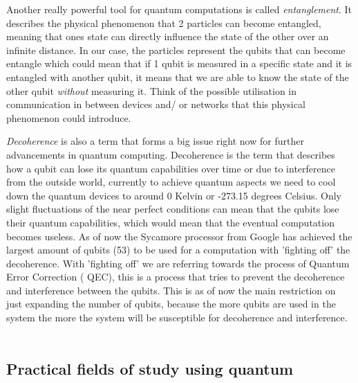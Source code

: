 Another really powerful tool for quantum computations is called \emph{entanglement}. It describes the physical phenomenon that 2 particles can become entangled, meaning that ones state can directly influence the state of the other over an infinite distance. In our case, the particles represent the qubits that can become entangle which could mean that if 1 qubit is measured in a specific state and it is entangled with another qubit, it means that we are able to know the state of the other qubit \emph{without} measuring it. Think of the possible utilisation in communication in between devices and/ or networks that this physical phenomenon could introduce.

\emph{Decoherence} is also a term that forms a big issue right now for further advancements in quantum computing. Decoherence is the term that describes how a qubit can lose its quantum capabilities over time or due to interference from the outside world, currently to achieve quantum aspects we need to cool down the quantum devices to around 0 Kelvin or -273.15 degrees Celsius. Only slight fluctuations of the near perfect conditions can mean that the qubits lose their quantum capabilities, which would mean that the eventual computation becomes useless. As of now the Sycamore processor from Google has achieved the largest amount of qubits (53) to be used for a computation with 'fighting off' the decoherence. With 'fighting off' we are referring towards the process of Quantum Error Correction ( QEC), this is a process that tries to prevent the decoherence and interference between the qubits. This is as of now the main restriction on just expanding the number of qubits, because the more qubits are used in the system the more the system will be susceptible for decoherence and interference. ~\autocite{Cory1998}

\subsection{Practical fields of study using quantum}

